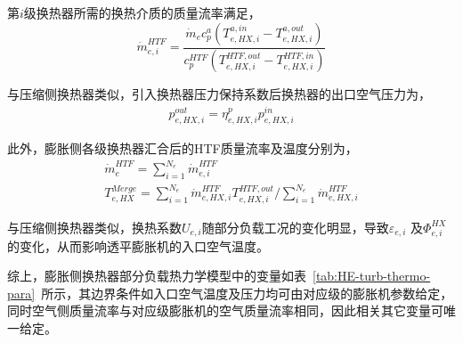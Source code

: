 第$i$级换热器所需的换热介质的质量流率满足，
\begin{equation}
\label{equ:he-turb-mass-flow}
\dot m_{e,i}^{HTF} = \frac{{{{\dot m}_e}c_p^a({T_{e,HX,i}^{a,in} - T_{e,HX,i}^{a,out}})}}{{c_p^{HTF}({T_{e,HX,i}^{HTF,out} - T_{e,HX,i}^{HTF,in}})}}
\end{equation}

与压缩侧换热器类似，引入换热器压力保持系数\cite{Thesis-Lixuemei}后换热器的出口空气压力为，
\begin{subequations}
\begin{gather}
p_{e,HX,i}^{out} = \eta _{e,HX,i}^pp_{e,HX,i}^{in}\label{equ:he-turb-pressure-out}
\end{gather}
\end{subequations}

此外，膨胀侧各级换热器汇合后的HTF质量流率及温度分别为，
\begin{subequations}
\begin{gather}
\dot m_e^{HTF} = \sum\limits_{i = 1}^{{N_e}} {\dot m_{e,i}^{HTF}} \label{equ:he-turb-mix-mass-flow}\\
T_{e,HX}^{Merge} = {{\sum\limits_{i = 1}^{{N_e}} {\dot m_{e,HX,i}^{HTF}T_{e,HX,i}^{HTF,out}} }}/{{\sum\limits_{i = 1}^{{N_e}} {\dot m_{e,HX,i}^{HTF}} }}\label{equ:he-turb-mix-temp}
\end{gather}
\end{subequations}

与压缩侧换热器类似，换热系数$U_{e,i}$随部分负载工况的变化明显，导致${\varepsilon _{e,i}}$ 及$\Phi _{e,i}^{HX}$的变化，从而影响透平膨胀机的入口空气温度。

综上，膨胀侧换热器部分负载热力学模型中的变量如表~\ref{tab:HE-turb-thermo-para}~所示，其边界条件如入口空气温度及压力均可由对应级的膨胀机参数给定，同时空气侧质量流率与对应级膨胀机的空气质量流率相同，因此相关其它变量可唯一给定。

